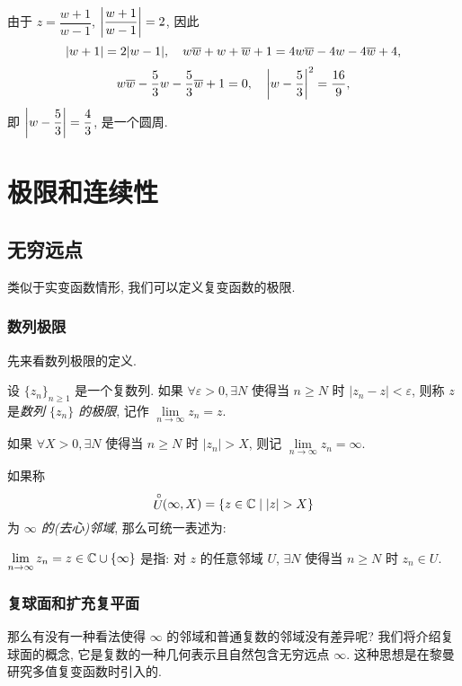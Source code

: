 \begin{solution}
  由于 $z=\dfrac{w+1}{w-1}$, $\left|\dfrac{w+1}{w-1}\right|=2$,
  {因此
  \[|w+1|=2|w-1|,\quad w\overline w+w+\overline w+1=4w\overline w-4w-4\overline w+4,\]}
  {
    \[w\overline w-\frac53 w-\frac53\overline w+1=0,\quad \left|w-\frac53\right|^2=\dfrac{16}9,\]即 $\left|w-\dfrac53\right|=\dfrac43$, 是一个圆周.}
\end{solution}


\section{极限和连续性}

\subsection{无穷远点}

类似于实变函数情形, 我们可以定义复变函数的极限.

\subsubsection*{数列极限}
先来看数列极限的定义.

\begin{definition}[数列极限的定义]
  设 $\{z_n\}_{n\ge 1}$ 是一个复数列.
  如果 $\forall \varepsilon>0,\exists N$ 使得当 $n\ge N$ 时 $|z_n-z|<\varepsilon$, 则称 $z$ 是\emph{数列 $\{z_n\}$ 的极限}, 记作 \emph{$\lim\limits_{n\to\infty}z_n=z$}.
\end{definition}

如果 $\forall X>0,\exists N$ 使得当 $n\ge N$ 时 $|z_n|>X$, 则记 \emph{$\lim\limits_{n\to\infty}z_n=\infty$}.

如果称
  \[\Uc(\infty,X)=\{z\in\BC\mid|z|>X\}\]
为 \emph{$\infty$ 的(去心)邻域},
那么可统一表述为:
\begin{definition}[数列极限的等价定义]
  $\lim\limits_{n\to\infty}z_n=z\in{\mathbb{C}}\cup{\left\{\infty\right\}}$ 是指: 对 $z$ 的任意邻域 $U$, $\exists N$ 使得当 $n\ge N$ 时 $z_n\in U$.
\end{definition}

\begin{center}
\end{center}


\subsubsection*{复球面和扩充复平面}
那么有没有一种看法使得 $\infty$ 的邻域和普通复数的邻域没有差异呢?
我们将介绍复球面的概念, 它是复数的一种几何表示且自然包含无穷远点 $\infty$.
这种思想是在黎曼研究多值复变函数时引入的.

